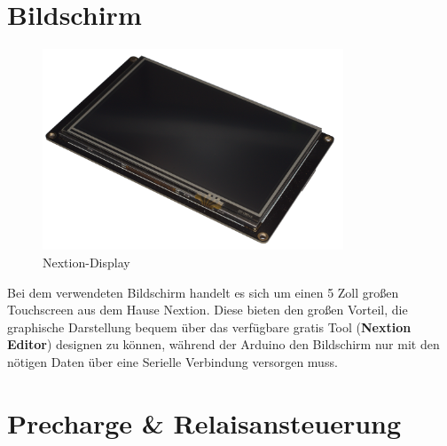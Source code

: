\section{Bildschirm}
\begin{figure}[h]
    \includegraphics[width=0.8\textwidth]{Fotos/Nextion_Display.png}
    \caption{Nextion-Display}
\end{figure}
Bei dem verwendeten Bildschirm handelt es sich um einen 5 Zoll großen Touchscreen aus dem Hause Nextion.
Diese bieten den großen Vorteil, die graphische Darstellung bequem über das verfügbare gratis Tool (\textbf{Nextion Editor}) designen zu können, während der Arduino den Bildschirm nur mit den nötigen Daten über eine Serielle Verbindung versorgen muss. 

\newpage
\section{Precharge \& Relaisansteuerung }